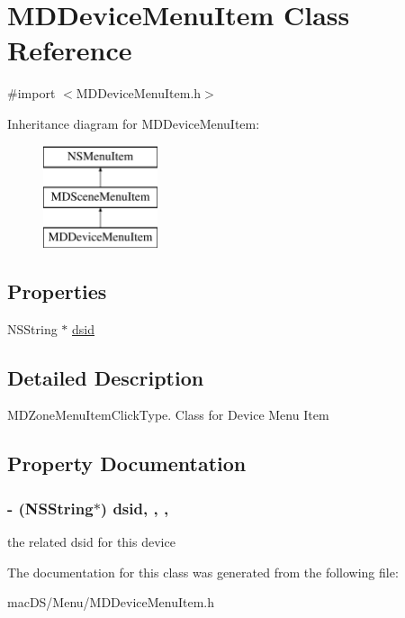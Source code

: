 \hypertarget{interface_m_d_device_menu_item}{\section{M\-D\-Device\-Menu\-Item Class Reference}
\label{interface_m_d_device_menu_item}
}


{\ttfamily \#import $<$M\-D\-Device\-Menu\-Item.\-h$>$}

Inheritance diagram for M\-D\-Device\-Menu\-Item\-:\begin{figure}[H]
\begin{center}
\leavevmode
\includegraphics[height=3.000000cm]{interface_m_d_device_menu_item}
\end{center}
\end{figure}
\subsection*{Properties}
\begin{DoxyCompactItemize}
\item 
N\-S\-String $\ast$ \hyperlink{interface_m_d_device_menu_item_aba1a1c831e4cace1935fef25e04a4b27}{dsid}
\end{DoxyCompactItemize}


\subsection{Detailed Description}
M\-D\-Zone\-Menu\-Item\-Click\-Type. Class for Device Menu Item 

\subsection{Property Documentation}
\hypertarget{interface_m_d_device_menu_item_aba1a1c831e4cace1935fef25e04a4b27}{
\subsubsection[{dsid}]{\setlength{\rightskip}{0pt plus 5cm}-\/ (N\-S\-String$\ast$) dsid\hspace{0.3cm}{\ttfamily [read]}, {\ttfamily [write]}, {\ttfamily [atomic]}, {\ttfamily [strong]}}}\label{interface_m_d_device_menu_item_aba1a1c831e4cace1935fef25e04a4b27}
the related dsid for this device 

The documentation for this class was generated from the following file\-:\begin{DoxyCompactItemize}
\item 
mac\-D\-S/\-Menu/M\-D\-Device\-Menu\-Item.\-h\end{DoxyCompactItemize}
